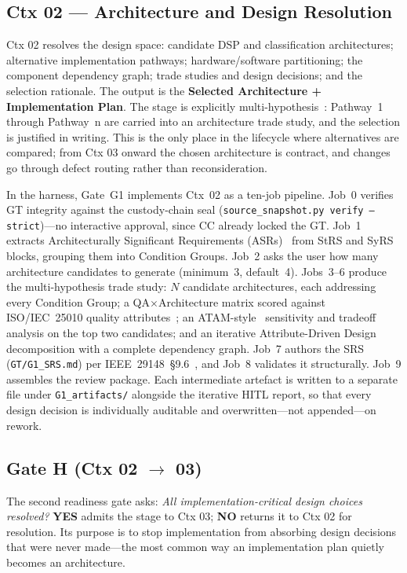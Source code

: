 \documentclass[11pt,a4paper]{article}
\begin{document}
\subsection{Ctx 02 --- Architecture and Design Resolution}
\label{sec:ctx02}

Ctx 02 resolves the design space: candidate DSP and classification architectures; alternative
implementation pathways; hardware/software partitioning; the component dependency graph; trade
studies and design decisions; and the selection rationale. The output is the \textbf{Selected
Architecture + Implementation Plan}. The stage is explicitly multi-hypothesis~\cite{bass2021}: Pathway~1 through
Pathway~n are carried into an architecture trade study, and the selection is justified in writing.
This is the only place in the lifecycle where alternatives are compared; from Ctx 03 onward the
chosen architecture is contract, and changes go through defect routing rather than reconsideration.

In the harness, Gate~G1 implements Ctx~02 as a ten-job pipeline.
Job~0 verifies GT integrity against the custody-chain seal (\texttt{source\_snapshot.py
verify --strict})---no interactive approval, since CC already locked the GT.
Job~1 extracts Architecturally Significant Requirements
(ASRs)~\cite{chen2013} from StRS and SyRS blocks,
grouping them into Condition Groups. Job~2 asks the user how many architecture candidates
to generate (minimum~3, default~4). Jobs~3--6 produce the multi-hypothesis trade study:
$N$ candidate architectures, each addressing every Condition Group; a QA$\times$Architecture
matrix scored against ISO/IEC~25010 quality attributes~\cite{iso25010}; an
ATAM-style~\cite{kazman2000} sensitivity and tradeoff
analysis on the top two candidates; and an iterative Attribute-Driven
Design~\cite{wojcik2006} decomposition
with a complete dependency graph. Job~7 authors the SRS (\texttt{GT/G1\_SRS.md}) per
IEEE~29148~\S9.6~\cite{ieee29148}, and Job~8 validates it structurally. Job~9 assembles the review package.
Each intermediate artefact is written to a separate file under
\texttt{G1\_artifacts/} alongside the iterative HITL report, so that every design decision
is individually auditable and overwritten---not appended---on rework.

\subsection{Gate H (Ctx 02 $\rightarrow$ 03)}
\label{sec:gate-h2}

The second readiness gate asks: \emph{All implementation-critical design choices resolved?}
\textbf{YES} admits the stage to Ctx 03; \textbf{NO} returns it to Ctx 02 for resolution. Its
purpose is to stop implementation from absorbing design decisions that were never made---the
most common way an implementation plan quietly becomes an architecture.
\end{document}
